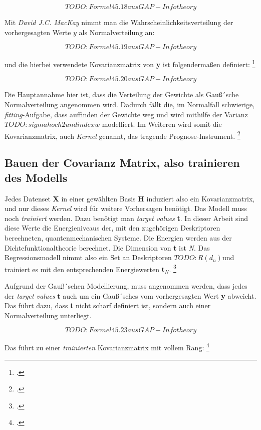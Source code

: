 $$TODO: Formel 45.18 aus GAP-Info theory$$

Mit \textit{David J.C. MacKay} nimmt man die Wahrscheinlichkeitsverteilung der vorhergesagten Werte $y$ als Normalverteilung an: 

$$TODO: Formel 45.19 aus GAP-Info theory$$

und die hierbei verwendete Kovarianzmatrix von \textbf{y} ist folgendermaßen definiert: \footcite[540]{GAP-info-theory}


$$TODO: Formel 45.20 aus GAP-Info theory$$

Die Hauptannahme hier ist, dass die Verteilung der Gewichte als Gauß´sche Normalverteilung angenommen wird. Dadurch fällt die, im Normalfall schwierige, \textit{fitting}-Aufgabe,  dass auffinden der Gewichte weg und wird mithilfe der Varianz $TODO: sigma hoch 2 und index w$ modelliert. Im Weiteren wird somit die Kovarianzmatrix, auch \textit{Kernel} genannt, das tragende Prognose-Instrument. \footcite[1052]{GAP-intro}




\subsection{Bauen der Covarianz Matrix, also trainieren des Modells}


Jedes Datenset \textbf{X} in einer gewählten Basis \textbf{H} induziert also ein Kovarianzmatrix, und nur dieses \textit{Kernel} wird für weitere Vorhersagen benötigt. Das Modell muss noch \textit{trainiert} werden. Dazu benötigt man \textit{target values} \textbf{t}. In dieser Arbeit sind diese Werte die Energieniveaus der, mit den zugehörigen Deskriptoren berechneten,  quantenmechanischen Systeme. Die Energien werden aus der Dichtefunktionaltheorie berechnet. Die Dimension von \textbf{t} ist \textit{N}. Das Regressionsmodell nimmt also ein Set an Deskriptoren $TODO: R(d_n) $und trainiert es mit den entsprechenden Energiewerten $\textbf{t}_N$. \footcite[3]{GAP-2009}

Aufgrund der Gauß´schen Modellierung, muss angenommen werden, dass jedes der \textit{target values} \textbf{t} auch um ein Gauß´sches vom vorhergesagten Wert \textbf{y} abweicht. Das führt dazu, dass \textbf{t} nicht scharf definiert ist, sondern auch einer Normalverteilung unterliegt. 


$$TODO: Formel 45.23 aus GAP-Info theory$$


Das führt zu einer \textit{trainierten} Kovarianzmatrix mit vollem Rang: \footcite[540]{GAP-info-theory}


